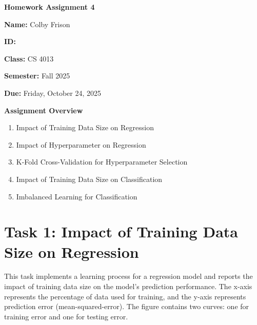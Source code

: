 \documentclass[letterpaper,11pt,twoside]{article}
\def\mypdfauthor{Colby Frison}
\def\thecurrentsemester{Fall 2025}
\def\myduedate{\textbf{Due:} Friday, October 24, 2025}
\begin{document}
\thispagestyle{firststyle}
\begin{center}
    \vspace*{6cm}
    
    {\Huge \textbf{Homework Assignment 4}}

    \vspace{.4cm}

    {\Large \textbf{Name:} \mypdfauthor}

    {\Large \textbf{ID:} }

    {\Large \textbf{Class:} CS 4013}

    {\Large \textbf{Semester:} \thecurrentsemester}

    {\Large \myduedate}

    \vspace{7cm}
    

    {\large \textbf{Assignment Overview}}
    
    \vspace{0.25cm}
    
    \begin{enumerate}[leftmargin=2cm]
        \item Impact of Training Data Size on Regression
        \item Impact of Hyperparameter on Regression  
        \item K-Fold Cross-Validation for Hyperparameter Selection
        \item Impact of Training Data Size on Classification
        \item Imbalanced Learning for Classification
    \end{enumerate}
    
\end{center}

\newpage

\section{Task 1: Impact of Training Data Size on Regression}

This task implements a learning process for a regression model and reports the impact of training data size on the model's prediction performance. The x-axis represents the percentage of data used for training, and the y-axis represents prediction error (mean-squared-error). The figure contains two curves: one for training error and one for testing error.
\end{document}
